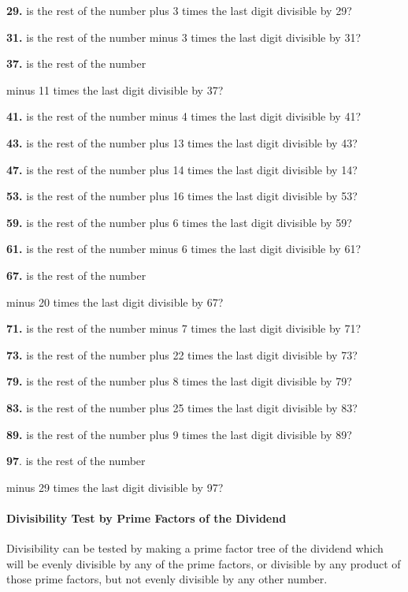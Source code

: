 \documentclass[12pt]{article}
\begin{document}
\textbf{29.} is the rest of the number plus 3 times the last digit divisible by 29?

\textbf{31.} is the rest of the number minus 3 times the last digit divisible by 31?

\textbf{37.} is the rest of the number

\hspace{2ex}minus 11 times the last digit divisible by 37?

\textbf{41.} is the rest of the number minus 4 times the last digit divisible by 41?

\textbf{43.} is the rest of the number plus 13 times the last digit divisible by 43?

\textbf{47.} is the rest of the number plus 14 times the last digit divisible by 14?

\textbf{53.} is the rest of the number plus 16 times the last digit divisible by 53?

\textbf{59.} is the rest of the number plus 6 times the last digit divisible by 59?

\textbf{61.} is the rest of the number minus 6 times the last digit divisible by 61?

\textbf{67.} is the rest of the number

\hspace{2ex}minus 20 times the last digit divisible by 67?

\textbf{71.} is the rest of the number minus 7 times the last digit divisible by 71?

\textbf{73.} is the rest of the number plus 22 times the last digit divisible by 73?

\textbf{79.} is the rest of the number plus 8 times the last digit divisible by 79?

\textbf{83.} is the rest of the number plus 25 times the last digit divisible by 83?

\textbf{89.} is the rest of the number plus 9 times the last digit divisible by 89?

\textbf{97}. is the rest of the number

\hspace{2ex}minus 29 times the last digit divisible by 97?

\paragraph{Divisibility Test by Prime Factors of the Dividend}

Divisibility can be tested by making a prime factor tree of the dividend which will be evenly divisible by any of the prime factors, or divisible by any product of those prime factors, but not evenly divisible by any other number.
\end{document}
